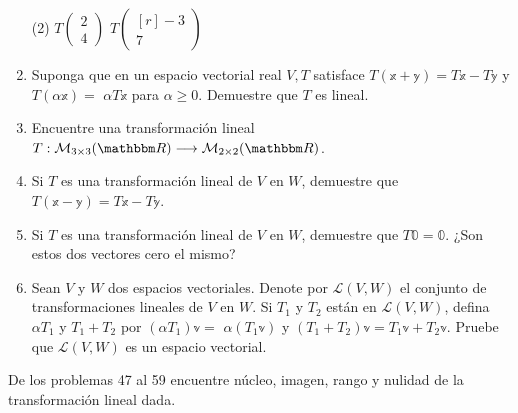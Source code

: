 \begin{enumerate}[start=18]
    \begin{tasks}(2)
        \task $T\begin{pmatrix*}2 \\ 4\end{pmatrix*}$
        \task $T\begin{pmatrix*}[r]-3 \\ 7\end{pmatrix*}$
    \end{tasks}
    \item Suponga que en un espacio vectorial real $V, T$ satisface $T(\mathbb{x}+\mathbb{y})=T \mathbb{x}-T \mathbb{y}$ y $T(\alpha \mathbb{x})=$ $\alpha T \mathbb{x}$ para $\alpha \geq 0$. Demuestre que $T$ es lineal.
    \item Encuentre una transformación lineal $T: \mathcal{M}_{3 \times 3}(\RR) \longrightarrow \mathcal{M}_{2 \times 2}(\RR)$.
    \item Si $T$ es una transformación lineal de $V$ en $W$, demuestre que $T(\mathbb{x}-\mathbb{y})=T \mathbb{x}-T \mathbb{y}$.
    \item Si $T$ es una transformación lineal de $V$ en $W$, demuestre que $T \mathbb{0}=\mathbb{0}$. ¿Son estos dos vectores cero el mismo?
    \item Sean $V$ y $W$ dos espacios vectoriales. Denote por $\mathcal{L}(V, W)$ el conjunto de transformaciones lineales de $V$ en $W$. Si $T_{1}$ y $T_{2}$ están en $\mathcal{L}(V, W)$, defina $\alpha T_{1}$ y $T_{1}+T_{2}$ por $\left(\alpha T_{1}\right) \mathbb{v}=$ $\alpha\left(T_{1} \mathbb{v}\right)$ y $\left(T_{1}+T_{2}\right) \mathbb{v}=T_{1} \mathbb{v}+T_{2} \mathbb{v}$. Pruebe que $\mathcal{L}(V, W)$ es un espacio vectorial.
\end{enumerate}\newpage\noindent
De los problemas 47 al 59 encuentre núcleo, imagen, rango y nulidad de la transformación lineal dada.
